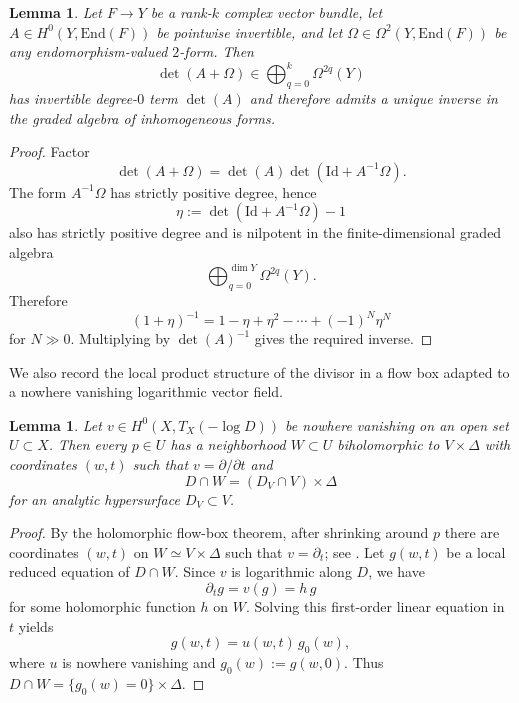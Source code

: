 \documentclass[12pt,a4paper,dvipsnames,x11names]{amsart}
\numberwithin{equation}{section}
\theoremstyle{plain}
\newtheorem{lemma}[theorem]{Lemma}
\theoremstyle{definition}
\theoremstyle{remark}
\newcommand{\End}{\mathrm{End}}
\begin{document}
\begin{lemma}\label{lem:invdet}
Let $F\to Y$ be a rank-$k$ complex vector bundle, let $A\in H^0(Y,\End(F))$ be pointwise invertible, and let $\Omega\in \Omega^2(Y,\End(F))$ be any endomorphism-valued $2$-form. Then
\begin{equation}\label{eq:invdet-statement}
\det(A+\Omega)
\in \bigoplus_{q=0}^{k}\Omega^{2q}(Y)
\end{equation}
has invertible degree-$0$ term $\det(A)$ and therefore admits a unique inverse in the graded algebra of inhomogeneous forms.
\end{lemma}

\begin{proof}
Factor
\begin{equation}\label{eq:factor-det}
\det(A+\Omega)=\det(A)\det(\mathrm{Id}+A^{-1}\Omega).
\end{equation}
The form $A^{-1}\Omega$ has strictly positive degree, hence
\begin{equation}\label{eq:nilpotent}
\eta:=\det(\mathrm{Id}+A^{-1}\Omega)-1
\end{equation}
also has strictly positive degree and is nilpotent in the finite-dimensional graded algebra $$\bigoplus_{q=0}^{\dim Y}\Omega^{2q}(Y).$$ Therefore
\begin{equation}\label{eq:geometric-series}
(1+\eta)^{-1}=1-\eta+\eta^2-\cdots+(-1)^N\eta^N
\end{equation}
for $N\gg 0$. Multiplying by $\det(A)^{-1}$ gives the required inverse.
\end{proof}

We also record the local product structure of the divisor in a flow box adapted to a nowhere vanishing logarithmic vector field.

\begin{lemma}\label{lem:product-divisor}
Let $v\in H^0(X,T_X(-\log D))$ be nowhere vanishing on an open set $U\subset X$. Then every $p\in U$ has a neighborhood $W\subset U$ biholomorphic to $V\times \Delta$ with coordinates $(w,t)$ such that
 $
v=\partial/\partial t
$
and
\begin{equation}\label{eq:product-divisor}
D\cap W=(D_V\cap V)\times \Delta
\end{equation}
for an analytic hypersurface $D_V\subset V$.
\end{lemma}

\begin{proof}
By the holomorphic flow-box theorem, after shrinking around $p$ there are coordinates $(w,t)$ on $W\simeq V\times \Delta$ such that $v=\partial_t$; see \cite[Chapter I]{SuwaBook}. Let $g(w,t)$ be a local reduced equation of $D\cap W$. Since $v$ is logarithmic along $D$, we have
\begin{equation}\label{eq:g-preserved}
\partial_t g=v(g)=h\,g
\end{equation}
for some holomorphic function $h$ on $W$. Solving this first-order linear equation in $t$ yields
\begin{equation}\label{eq:g-solution}
g(w,t)=u(w,t)\,g_0(w),
\end{equation}
where $u$ is nowhere vanishing and $g_0(w):=g(w,0)$. Thus $D\cap W=\{g_0(w)=0\}\times \Delta$.
\end{proof}
\end{document}

